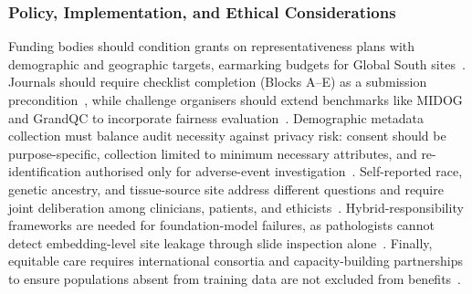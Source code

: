 \subsubsection{Policy, Implementation, and Ethical Considerations}
\label{sec:discussion:policy}
Funding bodies should condition grants on representativeness plans with demographic and geographic targets, earmarking budgets for Global South sites~\citep{celi2022sources, biswas2026digital}. Journals should require checklist completion (Blocks A--E) as a submission precondition~\citep{sounderajah2021stardai, chen2023algorithmic}, while challenge organisers should extend benchmarks like MIDOG and GrandQC to incorporate fairness evaluation~\citep{aubreville2022mitosis, weng2024grandqc}. Demographic metadata collection must balance audit necessity against privacy risk: consent should be purpose-specific, collection limited to minimum necessary attributes, and re-identification authorised only for adverse-event investigation~\citep{norori2021addressing, chen2023algorithmic}. Self-reported race, genetic ancestry, and tissue-source site address different questions and require joint deliberation among clinicians, patients, and ethicists~\citep{howard2021site, vaidya2024demographic}. Hybrid-responsibility frameworks are needed for foundation-model failures, as pathologists cannot detect embedding-level site leakage through slide inspection alone~\citep{cheng2021challenges, komen2024batch}. Finally, equitable care requires international consortia and capacity-building partnerships to ensure populations absent from training data are not excluded from benefits~\citep{musa2026cross, norori2021addressing}.
